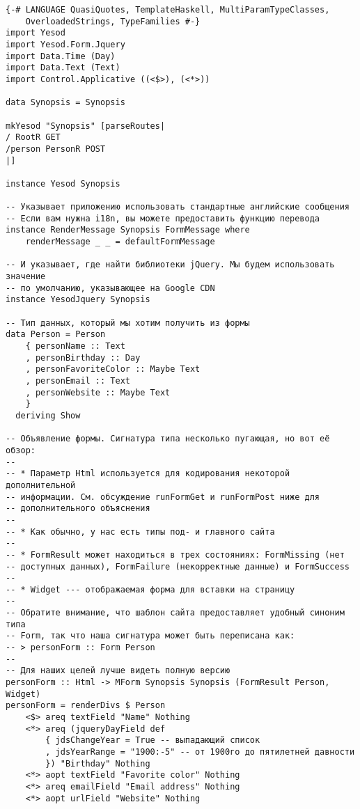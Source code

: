 \begin{lstlisting}
{-# LANGUAGE QuasiQuotes, TemplateHaskell, MultiParamTypeClasses,
    OverloadedStrings, TypeFamilies #-}
import Yesod
import Yesod.Form.Jquery
import Data.Time (Day)
import Data.Text (Text)
import Control.Applicative ((<$>), (<*>))

data Synopsis = Synopsis

mkYesod "Synopsis" [parseRoutes|
/ RootR GET
/person PersonR POST
|]

instance Yesod Synopsis

-- Указывает приложению использовать стандартные английские сообщения
-- Если вам нужна i18n, вы можете предоставить функцию перевода
instance RenderMessage Synopsis FormMessage where
    renderMessage _ _ = defaultFormMessage

-- И указывает, где найти библиотеки jQuery. Мы будем использовать значение
-- по умолчанию, указывающее на Google CDN
instance YesodJquery Synopsis

-- Тип данных, который мы хотим получить из формы
data Person = Person
    { personName :: Text
    , personBirthday :: Day
    , personFavoriteColor :: Maybe Text
    , personEmail :: Text
    , personWebsite :: Maybe Text
    }
  deriving Show

-- Объявление формы. Сигнатура типа несколько пугающая, но вот её обзор:
--
-- * Параметр Html используется для кодирования некоторой дополнительной
-- информации. См. обсуждение runFormGet и runFormPost ниже для 
-- дополнительного объяснения
--
-- * Как обычно, у нас есть типы под- и главного сайта
--
-- * FormResult может находиться в трех состояниях: FormMissing (нет
-- доступных данных), FormFailure (некорректные данные) и FormSuccess
--
-- * Widget --- отображаемая форма для вставки на страницу
--
-- Обратите внимание, что шаблон сайта предоставляет удобный синоним типа
-- Form, так что наша сигнатура может быть переписана как:
-- > personForm :: Form Person
--
-- Для наших целей лучше видеть полную версию
personForm :: Html -> MForm Synopsis Synopsis (FormResult Person, Widget)
personForm = renderDivs $ Person
    <$> areq textField "Name" Nothing
    <*> areq (jqueryDayField def
        { jdsChangeYear = True -- выпадающий список
        , jdsYearRange = "1900:-5" -- от 1900го до пятилетней давности
        }) "Birthday" Nothing
    <*> aopt textField "Favorite color" Nothing
    <*> areq emailField "Email address" Nothing
    <*> aopt urlField "Website" Nothing


\end{lstlisting}
